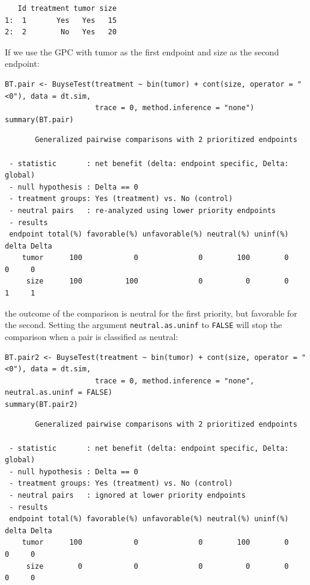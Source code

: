 \documentclass[12pt]{article}
\begin{document}
\begin{verbatim}
   Id treatment tumor size
1:  1       Yes   Yes   15
2:  2        No   Yes   20
\end{verbatim}


\bigskip

If we use the GPC with tumor as the first endpoint and size as the
second endpoint:
\lstset{language=r,label= ,caption= ,captionpos=b,numbers=none}
\begin{lstlisting}
BT.pair <- BuyseTest(treatment ~ bin(tumor) + cont(size, operator = "<0"), data = dt.sim,
                     trace = 0, method.inference = "none")
summary(BT.pair)
\end{lstlisting}

\begin{verbatim}
       Generalized pairwise comparisons with 2 prioritized endpoints

 - statistic       : net benefit (delta: endpoint specific, Delta: global) 
 - null hypothesis : Delta == 0 
 - treatment groups: Yes (treatment) vs. No (control) 
 - neutral pairs   : re-analyzed using lower priority endpoints
 - results
 endpoint total(%) favorable(%) unfavorable(%) neutral(%) uninf(%) delta Delta
    tumor      100            0              0        100        0     0     0
     size      100          100              0          0        0     1     1
\end{verbatim}

the outcome of the comparison is neutral for the first priority, but
favorable for the second. Setting the argument \texttt{neutral.as.uninf} to
\texttt{FALSE} will stop the comparison when a pair is classified as neutral:
\lstset{language=r,label= ,caption= ,captionpos=b,numbers=none}
\begin{lstlisting}
BT.pair2 <- BuyseTest(treatment ~ bin(tumor) + cont(size, operator = "<0"), data = dt.sim,
                     trace = 0, method.inference = "none", neutral.as.uninf = FALSE)
summary(BT.pair2)
\end{lstlisting}

\begin{verbatim}
       Generalized pairwise comparisons with 2 prioritized endpoints

 - statistic       : net benefit (delta: endpoint specific, Delta: global) 
 - null hypothesis : Delta == 0 
 - treatment groups: Yes (treatment) vs. No (control) 
 - neutral pairs   : ignored at lower priority endpoints
 - results
 endpoint total(%) favorable(%) unfavorable(%) neutral(%) uninf(%) delta Delta
    tumor      100            0              0        100        0     0     0
     size        0            0              0          0        0     0     0
\end{verbatim}
\end{document}
